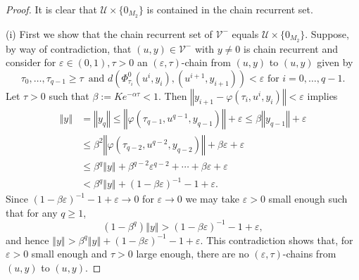 \documentclass{siamltex}%
\begin{document}
\begin{proof}
It is clear that $\mathcal{U}\times\{0_{M_{2}}\}$ is contained in the chain
recurrent set.

(i) First we show that the chain recurrent set of $\mathcal{V}^{-}$ equals
$\mathcal{U}\times\{0_{M_{2}}\}$. Suppose, by way of contradiction, that
$(u,y)\in\mathcal{V}^{-}$ with $y\not =0$ is chain recurrent and consider for
$\varepsilon\in(0,1),\tau>0$ an $(\varepsilon,\tau)$-chain from $(u,y)$ to
$(u,y)$ given by%
\[
\tau_{0},\ldots,\tau_{q-1}\geq\tau\,\text{\ and }d(\Phi_{\tau_{i}}^{0}%
(u^{i},y_{i}),(u^{i+1},y_{i+1}))<\varepsilon\text{ for }i=0,\ldots,q-1.
\]
Let $\tau>0$ such that $\beta:=Ke^{-\alpha\tau}<1$. Then $\left\Vert
y_{i+1}-\varphi(\tau_{i},u^{i},y_{i})\right\Vert <\varepsilon$ implies%
\begin{align*}
\left\Vert y\right\Vert  &  =\left\Vert y_{q}\right\Vert \leq\left\Vert
\varphi(\tau_{q-1},u^{q-1},y_{q-1})\right\Vert +\varepsilon\leq\beta\left\Vert
y_{q-1}\right\Vert +\varepsilon\\
&  \leq\beta^{2}\left\Vert \varphi(\tau_{q-2},u^{q-2},y_{q-2})\right\Vert
+\beta\varepsilon+\varepsilon\\
&  \leq\beta^{q}\left\Vert y\right\Vert +\beta^{q-2}\varepsilon^{q-2}%
+\cdots+\beta\varepsilon+\varepsilon\\
&  <\beta^{q}\left\Vert y\right\Vert +(1-\beta\varepsilon)^{-1}-1+\varepsilon.
\end{align*}
Since $(1-\beta\varepsilon)^{-1}-1+\varepsilon\rightarrow0$ for $\varepsilon
\rightarrow0$ we may take $\varepsilon>0$ small enough such that for any
$q\geq1$,%
\[
(1-\beta^{q})\left\Vert y\right\Vert >(1-\beta\varepsilon)^{-1}-1+\varepsilon
,
\]
and hence $\left\Vert y\right\Vert >\beta^{q}\left\Vert y\right\Vert
+(1-\beta\varepsilon)^{-1}-1+\varepsilon$. This contradiction shows that, for
$\varepsilon>0$ small enough and $\tau>0$ large enough, there are no
$(\varepsilon,\tau)$-chains from $(u,y)$ to $(u,y)$.


\end{proof}
\end{document}

